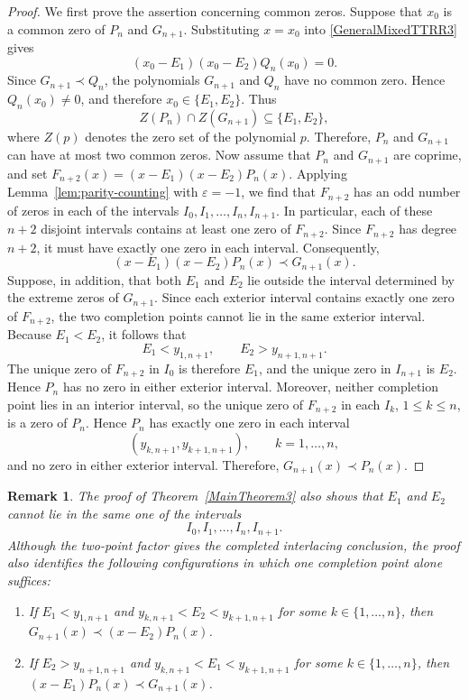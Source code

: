 \documentclass[final,3p,times,12pt]{elsarticle}
\newtheorem{remark}{Remark}[section]
\numberwithin{equation}{section}  %
\begin{document}
\begin{proof}
We first prove the assertion concerning common zeros. Suppose that $x_0$ is a
common zero of $P_n$ and $G_{n+1}$. Substituting $x=x_0$ into \eqref{GeneralMixedTTRR3}
gives
\[
(x_0-E_1)(x_0-E_2)Q_n(x_0)=0.
\]
Since $G_{n+1}\prec Q_n$, the polynomials $G_{n+1}$ and $Q_n$ have no
common zero. Hence $Q_n(x_0)\neq 0$, and therefore $x_0\in\{E_1,E_2\}$.
Thus
\[
Z(P_n)\cap Z(G_{n+1})\subseteq\{E_1,E_2\},
\]
where $Z(p)$ denotes the zero set of the polynomial $p$. Therefore, $P_n$ and $G_{n+1}$ can have at most two common zeros. Now assume that $P_n$ and $G_{n+1}$ are coprime, and set $F_{n+2}(x)=(x-E_1)(x-E_2)P_n(x).$
Applying Lemma~\ref{lem:parity-counting} with $\varepsilon=-1$, we find that $F_{n+2}$ has an
odd number of zeros in each of the intervals $I_0,I_1,\ldots,I_n,I_{n+1}.$
In particular, each of these $n+2$ disjoint intervals contains at least one
zero of $F_{n+2}$. Since $F_{n+2}$ has degree $n+2$, it must have exactly
one zero in each interval. Consequently,
\[
(x-E_1)(x-E_2)P_n(x)\prec G_{n+1}(x).
\] Suppose, in addition, that both $E_1$ and $E_2$ lie outside the interval
determined by the extreme zeros of $G_{n+1}$. Since each exterior interval
contains exactly one zero of $F_{n+2}$, the two completion points cannot lie
in the same exterior interval. Because $E_1<E_2$, it follows that
\[
E_1<y_{1,n+1},
\qquad
E_2>y_{n+1,n+1}.
\]
The unique zero of $F_{n+2}$ in $I_0$ is therefore $E_1$, and the unique
zero in $I_{n+1}$ is $E_2$. Hence $P_n$ has no zero in either exterior
interval. Moreover, neither completion point lies in an interior interval, so
the unique zero of $F_{n+2}$ in each $I_k$, $1\leq k\leq n$, is a zero
of $P_n$. Hence $P_n$ has exactly one zero in each interval
\[
(y_{k,n+1},y_{k+1,n+1}), \qquad k=1,\ldots,n,
\]
and no zero in either exterior interval. Therefore,  $G_{n+1}(x)\prec P_n(x).$
\end{proof}
\begin{remark}\label{Conclusion-Proof-MainTheorem3}
The proof of Theorem~\ref{MainTheorem3} also shows that $E_1$ and $E_2$ cannot lie
in the same one of the intervals
\[
I_0,I_1,\ldots,I_n,I_{n+1}.
\]
Although the two-point factor gives the completed interlacing
conclusion, the proof also identifies the following configurations in
which one completion point alone suffices:
		\begin{enumerate}[label=\alph*)]
			\item 
			If $E_1<y_{1,n+1}$ and $y_{k,n+1}<E_2<y_{k+1,n+1}$ for some $k\in\{1,\dots,n\}$, then $G_{n+1}(x)\prec (x-E_2)P_n(x)$.
			\item 
			If $E_2>y_{n+1,n+1}$ and $y_{k,n+1}<E_1<y_{k+1,n+1}$ for some $k\in\{1,\dots,n\}$, then $(x-E_1)P_n(x)\prec G_{n+1}(x)$.
		\end{enumerate}

\end{remark}
 
\end{document}
